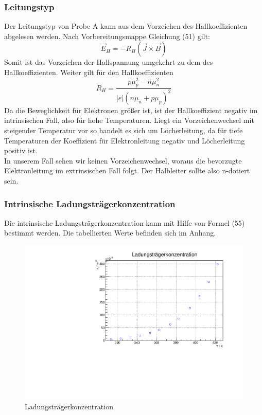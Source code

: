 \FloatBarrier
\subsubsection{Leitungstyp}

Der Leitungstyp von Probe A kann aus dem Vorzeichen des Hallkoeffizienten abgelesen werden. Nach Vorbereitungsmappe Gleichung (51) gilt:
$$\vec{E}_H = - R_H (\vec{J} \times \vec{B}) $$
Somit ist das Vorzeichen der Hallspannung umgekehrt zu dem des Hallkoeffizienten. Weiter gilt für den Hallkoeffizienten
$$R_H = \frac{p\mu_p^{2} - n \mu _n ^{2}}{\vert e \vert (n \mu _n + p \mu _p)^{2}} $$
Da die Beweglichkeit für Elektronen größer ist, ist der Hallkoeffizient negativ im intrinsischen Fall, also für hohe Temperaturen. Liegt ein Vorzeichenwechsel mit steigender Temperatur vor so handelt es sich um Löcherleitung, da für tiefe Temperaturen der Koeffizient für Elektronleitung negativ und Löcherleitung positiv ist. \\
In unserem Fall sehen wir keinen Vorzeichenwechsel, woraus die bevorzugte Elektronleitung im extrinsischen Fall folgt. Der Halbleiter sollte also n-dotiert sein.

\FloatBarrier
\subsubsection{Intrinsische Ladungsträgerkonzentration}
Die intrinsische Ladungsträgerkonzentration kann mit Hilfe von Formel (55) bestimmt werden. Die tabellierten Werte befinden sich im Anhang.

\begin{figure}
\label{fig:leitin}
\centering
\includegraphics[scale = 0.5]{../data/A4.pdf}
\caption{Ladungsträgerkonzentration}
\end{figure}


